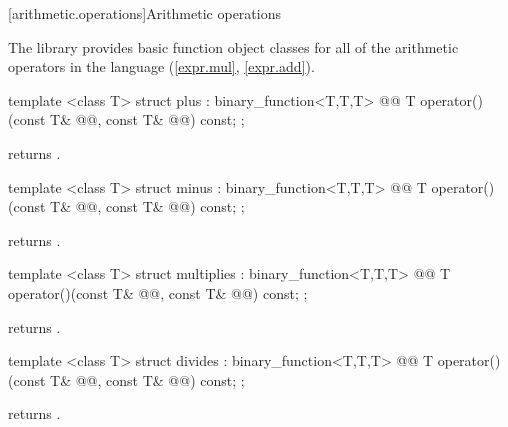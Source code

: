 \documentclass[american,twoside]{book}
\begin{document}
[arithmetic.operations]{Arithmetic operations}

\pnum
The library provides basic function object classes for all of the arithmetic
operators in the language (\ref{expr.mul}, \ref{expr.add}).

%
\begin{itemdecl}
template <class T> struct plus : binary_function<T,T,T> {
  @@
    T operator()(const T& @@, const T& @@) const;
};
\end{itemdecl}

\begin{itemdescr}
\pnum
{}
returns
.
\end{itemdescr}

%
\begin{itemdecl}
template <class T> struct minus : binary_function<T,T,T> {
  @@
    T operator()(const T& @@, const T& @@) const;
};
\end{itemdecl}

\begin{itemdescr}
\pnum
{}
returns
.
\end{itemdescr}

%
\begin{itemdecl}
template <class T> struct multiplies : binary_function<T,T,T> {
  @@
    T operator()(const T& @@, const T& @@) const;
};
\end{itemdecl}

\begin{itemdescr}
\pnum
{}
returns
.
\end{itemdescr}

%
\begin{itemdecl}
template <class T> struct divides : binary_function<T,T,T> {
  @@
  T operator()(const T& @@, const T& @@) const;
};
\end{itemdecl}

\begin{itemdescr}
\pnum
{}
returns
.
\end{itemdescr}
\end{document}
